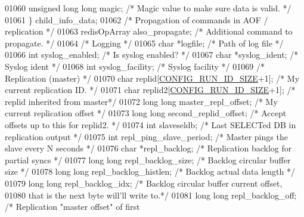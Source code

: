 \begin{DoxyCode}
{{{{{{{01060         \textcolor{keywordtype}{unsigned} \textcolor{keywordtype}{long} \textcolor{keywordtype}{long} magic;   \textcolor{comment}{/* Magic value to make sure data is valid. */}
01061     \} child\_info\_data;
01062     \textcolor{comment}{/* Propagation of commands in AOF / replication */}
01063     redisOpArray also\_propagate;    \textcolor{comment}{/* Additional command to propagate. */}
01064     \textcolor{comment}{/* Logging */}
01065     \textcolor{keywordtype}{char} *logfile;                  \textcolor{comment}{/* Path of log file */}
01066     \textcolor{keywordtype}{int} syslog\_enabled;             \textcolor{comment}{/* Is syslog enabled? */}
01067     \textcolor{keywordtype}{char} *syslog\_ident;             \textcolor{comment}{/* Syslog ident */}
01068     \textcolor{keywordtype}{int} syslog\_facility;            \textcolor{comment}{/* Syslog facility */}
01069     \textcolor{comment}{/* Replication (master) */}
01070     \textcolor{keywordtype}{char} replid[\hyperlink{server_8h_aba6794fa3ee28f85165eaed93190f1df}{CONFIG\_RUN\_ID\_SIZE}+1];  \textcolor{comment}{/* My current replication ID. */}
01071     \textcolor{keywordtype}{char} replid2[\hyperlink{server_8h_aba6794fa3ee28f85165eaed93190f1df}{CONFIG\_RUN\_ID\_SIZE}+1]; \textcolor{comment}{/* replid inherited from master*/}
01072     \textcolor{keywordtype}{long} \textcolor{keywordtype}{long} master\_repl\_offset;   \textcolor{comment}{/* My current replication offset */}
01073     \textcolor{keywordtype}{long} \textcolor{keywordtype}{long} second\_replid\_offset; \textcolor{comment}{/* Accept offsets up to this for replid2. */}
01074     \textcolor{keywordtype}{int} slaveseldb;                 \textcolor{comment}{/* Last SELECTed DB in replication output */}
01075     \textcolor{keywordtype}{int} repl\_ping\_slave\_period;     \textcolor{comment}{/* Master pings the slave every N seconds */}
01076     \textcolor{keywordtype}{char} *repl\_backlog;             \textcolor{comment}{/* Replication backlog for partial syncs */}
01077     \textcolor{keywordtype}{long} \textcolor{keywordtype}{long} repl\_backlog\_size;    \textcolor{comment}{/* Backlog circular buffer size */}
01078     \textcolor{keywordtype}{long} \textcolor{keywordtype}{long} repl\_backlog\_histlen; \textcolor{comment}{/* Backlog actual data length */}
01079     \textcolor{keywordtype}{long} \textcolor{keywordtype}{long} repl\_backlog\_idx;     \textcolor{comment}{/* Backlog circular buffer current offset,}
01080 \textcolor{comment}{                                       that is the next byte will'll write to.*/}
01081     \textcolor{keywordtype}{long} \textcolor{keywordtype}{long} repl\_backlog\_off;     \textcolor{comment}{/* Replication "master offset" of first}
}}}}}}}
\end{DoxyCode}
